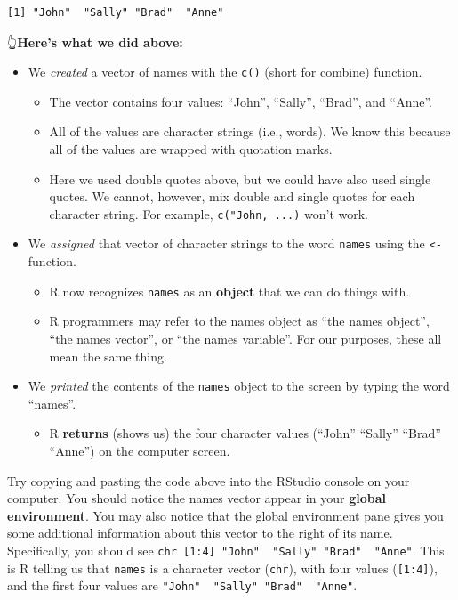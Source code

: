 \documentclass[
  letterpaper,
  DIV=11,
  numbers=noendperiod]{scrreprt}
\providecommand{\tightlist}{%
  \setlength{\itemsep}{0pt}\setlength{\parskip}{0pt}}\usepackage{longtable,booktabs,array}
\begin{document}
\begin{verbatim}
[1] "John"  "Sally" "Brad"  "Anne" 
\end{verbatim}

👆\textbf{Here's what we did above:}

\begin{itemize}
\item
  We \emph{created} a vector of names with the \texttt{c()} (short for
  combine) function.

  \begin{itemize}
  \item
    The vector contains four values: ``John'', ``Sally'', ``Brad'', and
    ``Anne''.
  \item
    All of the values are character strings (i.e., words). We know this
    because all of the values are wrapped with quotation marks.
  \item
    Here we used double quotes above, but we could have also used single
    quotes. We cannot, however, mix double and single quotes for each
    character string. For example,
    \texttt{c("John\textquotesingle{},\ ...)} won't work.
  \end{itemize}
\item
  We \emph{assigned} that vector of character strings to the word
  \texttt{names} using the \texttt{\textless{}-} function.

  \begin{itemize}
  \item
    R now recognizes \texttt{names} as an \textbf{object} that we can do
    things with.
  \item
    R programmers may refer to the names object as ``the names object'',
    ``the names vector'', or ``the names variable''. For our purposes,
    these all mean the same thing.
  \end{itemize}
\item
  We \emph{printed} the contents of the \texttt{names} object to the
  screen by typing the word ``names''.

  \begin{itemize}
  \tightlist
  \item
    R \textbf{returns} (shows us) the four character values (``John''
    ``Sally'' ``Brad'' ``Anne'') on the computer screen.
  \end{itemize}
\end{itemize}

Try copying and pasting the code above into the RStudio console on your
computer. You should notice the names vector appear in your
\textbf{global environment}. You may also notice that the global
environment pane gives you some additional information about this vector
to the right of its name. Specifically, you should see
\texttt{chr\ {[}1:4{]}\ "John"\ \ "Sally"\ "Brad"\ \ "Anne"}. This is R
telling us that \texttt{names} is a character vector (\texttt{chr}),
with four values (\texttt{{[}1:4{]}}), and the first four values are
\texttt{"John"\ \ "Sally"\ "Brad"\ \ "Anne"}.
\end{document}
